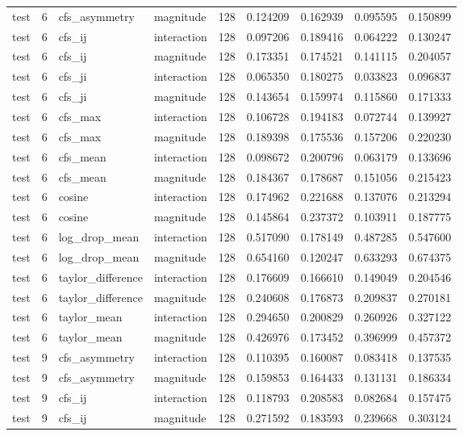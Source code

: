 \begin{tabular}{lrllrrrrr}
test & 6 & cfs_asymmetry & magnitude & 128 & 0.124209 & 0.162939 & 0.095595 & 0.150899 \\
test & 6 & cfs_ij & interaction & 128 & 0.097206 & 0.189416 & 0.064222 & 0.130247 \\
test & 6 & cfs_ij & magnitude & 128 & 0.173351 & 0.174521 & 0.141115 & 0.204057 \\
test & 6 & cfs_ji & interaction & 128 & 0.065350 & 0.180275 & 0.033823 & 0.096837 \\
test & 6 & cfs_ji & magnitude & 128 & 0.143654 & 0.159974 & 0.115860 & 0.171333 \\
test & 6 & cfs_max & interaction & 128 & 0.106728 & 0.194183 & 0.072744 & 0.139927 \\
test & 6 & cfs_max & magnitude & 128 & 0.189398 & 0.175536 & 0.157206 & 0.220230 \\
test & 6 & cfs_mean & interaction & 128 & 0.098672 & 0.200796 & 0.063179 & 0.133696 \\
test & 6 & cfs_mean & magnitude & 128 & 0.184367 & 0.178687 & 0.151056 & 0.215423 \\
test & 6 & cosine & interaction & 128 & 0.174962 & 0.221688 & 0.137076 & 0.213294 \\
test & 6 & cosine & magnitude & 128 & 0.145864 & 0.237372 & 0.103911 & 0.187775 \\
test & 6 & log_drop_mean & interaction & 128 & 0.517090 & 0.178149 & 0.487285 & 0.547600 \\
test & 6 & log_drop_mean & magnitude & 128 & 0.654160 & 0.120247 & 0.633293 & 0.674375 \\
test & 6 & taylor_difference & interaction & 128 & 0.176609 & 0.166610 & 0.149049 & 0.204546 \\
test & 6 & taylor_difference & magnitude & 128 & 0.240608 & 0.176873 & 0.209837 & 0.270181 \\
test & 6 & taylor_mean & interaction & 128 & 0.294650 & 0.200829 & 0.260926 & 0.327122 \\
test & 6 & taylor_mean & magnitude & 128 & 0.426976 & 0.173452 & 0.396999 & 0.457372 \\
test & 9 & cfs_asymmetry & interaction & 128 & 0.110395 & 0.160087 & 0.083418 & 0.137535 \\
test & 9 & cfs_asymmetry & magnitude & 128 & 0.159853 & 0.164433 & 0.131131 & 0.186334 \\
test & 9 & cfs_ij & interaction & 128 & 0.118793 & 0.208583 & 0.082684 & 0.157475 \\
test & 9 & cfs_ij & magnitude & 128 & 0.271592 & 0.183593 & 0.239668 & 0.303124 \\

\end{tabular}
